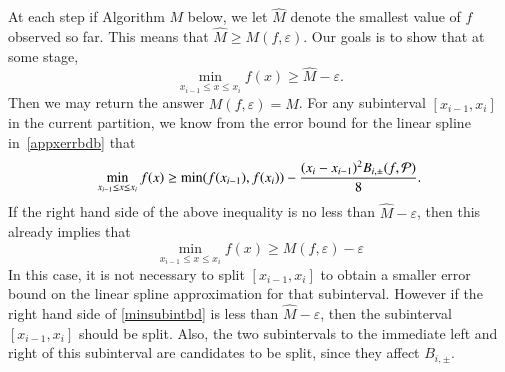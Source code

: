 \documentclass[review]{elsarticle}
\newcommand{\abstol}{\varepsilon}
\theoremstyle{definition}
\newcommand{\hM}{\widehat{M}}
\newcommand{\minfii}{\min(f(x_{i-1}), f(x_i))} %
\begin{document}
At each step if Algorithm $M$ below, we let $\hM$ denote the smallest value of $f$ observed so far.  This means that $\hM \ge M(f,\abstol)$.  Our goals is to show that at some stage,
\[
\min_{x_{i-1} \le x \le x_i} f(x) \ge \hM - \abstol.
\]
Then we may return the answer $M(f,\abstol) = \hM$.
For any subinterval $[x_{i-1}, x_i]$ in the current partition, we know from the error bound for the linear spline
in~\eqref{appxerrbdb} that
\begin{equation} \label{minsubintbd}
\min_{x_{i-1} \le x \le x_i} f(x) \ge \minfii -\frac{(x_i - x_{i-1})^2B_{i,\pm}(f,\cp)}{8}.
\end{equation}
If the right hand side of the above inequality is no less than $\hM - \abstol$, then this already implies that
\[
\min_{x_{i-1} \le x \le x_i} f(x) \ge M(f,\abstol) - \abstol
\]
In this case, it is not necessary to split $[x_{i-1}, x_i]$ to obtain a smaller error bound on the linear spline approximation for that subinterval.  However if the right hand side of \eqref{minsubintbd} is less than $\hM - \abstol$, then the subinterval $[x_{i-1}, x_i]$ should be split.  Also, the two subintervals to the immediate left and right of this subinterval are candidates to be split, since they affect $B_{i,\pm}$.
\end{document}
